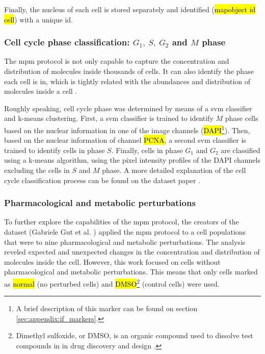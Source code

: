 Finally, the nucleus of each cell is stored separately and identified (\hl{mapobject id cell}) with a unique id.

\subsubsection{Cell cycle phase classification: $G_1,\ S,\ G_2$ and $M$ phase}

The \gls{mpm} protocol is not only capable to capture the concentration and distribution of molecules inside thousands of cells. It can also identify the phase each cell is in, which is tightly related with the abundances and distribution of molecules inside a cell \cite{Guteaar7042}.

Roughly speaking, cell cycle phase was determined by means of a \gls{svm} classifier and k-means clustering. First, a \gls{svm} classifier is trained to identify $M$ phase cells based on the nuclear information in one of the image channels (\hl{DAPI}\footnote{A brief description of this marker can be found on section \ref{sec:appendix:if_markers}.}). Then, based on the nuclear information of channel \hl{PCNA}, a second \gls{svm} classifier is trained to identify cells in phase $S$. Finally, cells in phase $G_1$ and $G_2$ are classified using a k-means algorithm, using the pixel intensity profiles of the DAPI channels excluding the cells in $S$ and $M$ phase. A more detailed explanation of the cell cycle classification process can be found on the dataset paper \cite{Guteaar7042}.

\subsubsection{Pharmacological and metabolic perturbations}

To further explore the capabilities of the \gls{mpm} protocol, the creators of the dataset (Gabriele Gut et al. \cite{Guteaar7042}) applied the \gls{mpm} protocol to a cell populations that were to nine pharmacological and metabolic perturbations. The analysis reveled expected and unexpected changes in the concentration and distribution of molecules inside the cell. However, this work focused on cells without pharmacological and metabolic perturbations. This means that only cells marked as \hl{normal} (no perturbed cells) and \hl{DMSO}\footnote{Dimethyl sulfoxide, or DMSO, is an organic compound used to dissolve test compounds in in drug discovery and design \cite{cushnie2020bioprospecting}.} (control cells) were used.


